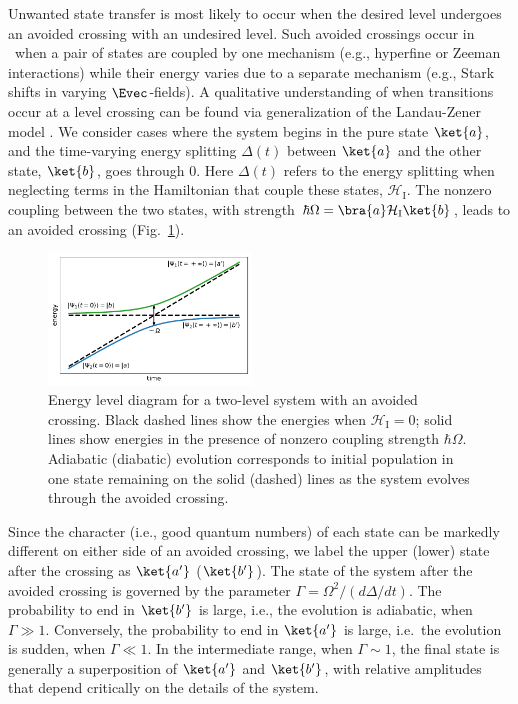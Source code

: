 Unwanted state transfer is most likely to occur when the desired level undergoes an avoided crossing with an undesired level. Such avoided crossings occur in \CENTREX\ when a pair of states are coupled by one mechanism (e.g., hyperfine or Zeeman interactions) while their energy varies due to a separate mechanism (e.g., Stark shifts in varying $\Evec$-fields). 
A qualitative understanding of when transitions occur at a level crossing can be found via generalization of the Landau-Zener model \cite{wittig_landauzener_2005}.  We consider cases where the system begins in the pure state $\ket{a}$, and the time-varying energy splitting $\Delta(t)$ between $\ket{a}$ and the other state, $\ket{b}$, goes through 0. Here $\Delta(t)$ refers to the energy splitting when neglecting terms in the Hamiltonian that couple these states, $\mathcal{H}_\text{I}$. The nonzero coupling between the two states, with strength $\hbar\Omega = \bra{a}\mathcal{H}_\text{I}\ket{b} $, leads to an avoided crossing (Fig.~\ref{fig:LZ_energy_diagram}).
\begin{figure}
	\centering
	\includegraphics[width=0.48\textwidth,unit=1mm]{figs/matplotlib/lz_energy_diagram.pdf}
	\caption{Energy level diagram for a two-level system with an avoided crossing. Black dashed lines show the energies when $\mathcal{H}_\text{I} = 0$; solid lines show energies in the presence of nonzero coupling strength $\hbar\Omega$. Adiabatic (diabatic) evolution corresponds to initial population in one state remaining on the solid (dashed) lines as the system evolves through the avoided crossing.}
	\label{fig:LZ_energy_diagram}
\end{figure}

Since the character (i.e., good quantum numbers) of each state can be markedly different on either side of an avoided crossing, we label the upper (lower) state after the crossing as $\ket{a'}$ ($\ket{b'}$).  
The state of the system after the avoided crossing is governed by the parameter $\Gamma = \Omega^2/(d\Delta/dt)$. The probability to end in $\ket{b'}$ is large, i.e., the evolution is adiabatic, when $\Gamma \gg 1$. Conversely, the probability to end in $\ket{a'}$ is large, i.e.\ the evolution is sudden, when $\Gamma \ll 1$. In the intermediate range, when $\Gamma\!\sim\! 1$, the final state is generally a superposition of $\ket{a'}$ and $\ket{b'}$, with relative amplitudes that depend critically on the details of the system.

